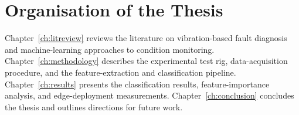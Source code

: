 \section{Organisation of the Thesis}
Chapter~\ref{ch:litreview} reviews the literature on vibration-based fault diagnosis and
machine-learning approaches to condition monitoring. Chapter~\ref{ch:methodology} describes the
experimental test rig, data-acquisition procedure, and the feature-extraction and classification
pipeline. Chapter~\ref{ch:results} presents the classification results, feature-importance
analysis, and edge-deployment measurements. Chapter~\ref{ch:conclusion} concludes the thesis and
outlines directions for future work.

